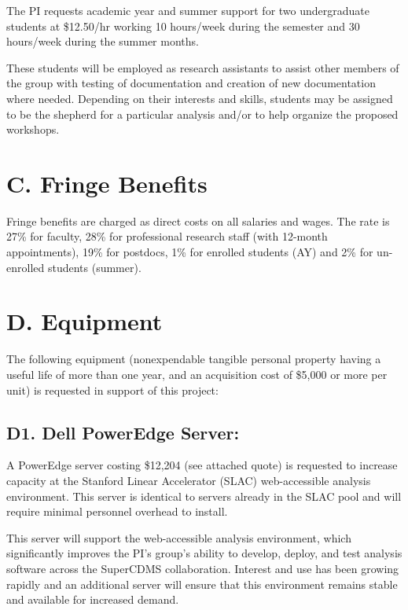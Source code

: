 \documentclass[11pt,oneside]{memoir}
\begin{document}
The PI requests academic year and summer support for two undergraduate students at \$12.50/hr working 10 hours/week during the semester and 30 hours/week during the summer months.

These students will be employed as research assistants to assist other members of the group with testing of documentation and creation of new documentation where needed.  Depending on their interests and skills, students may be assigned to be the shepherd for a particular analysis and/or to help organize the proposed workshops.  


\section*{C. Fringe Benefits} 

Fringe benefits are charged as direct costs on all salaries and wages. The rate is 27\% for faculty, 28\% for professional research staff (with 12-month appointments), 19\% for postdocs, 1\% for enrolled students (AY) and 2\% for un-enrolled students (summer).

\section*{D. Equipment}
The following equipment (nonexpendable tangible personal property having a useful life of more than one year, and an acquisition cost of \$5,000 or more per unit) is requested in support of this project:

\subsection{D1. Dell PowerEdge Server:}  A PowerEdge server costing \$12,204 (see attached quote) is requested to increase capacity at the Stanford Linear Accelerator (SLAC) web-accessible analysis environment.  This server is identical to servers already in the SLAC pool and will require minimal personnel overhead to install.

This server will support the web-accessible analysis environment, which significantly improves the PI's group's ability to develop, deploy, and test analysis software across the SuperCDMS collaboration.  Interest and use has been growing rapidly and an additional server will ensure that this environment remains stable and available for increased demand.
\end{document}
